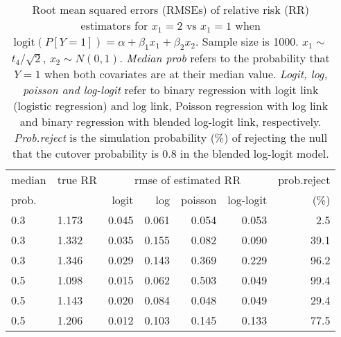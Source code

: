 \documentclass[12pt,a4paper]{article}
\begin{document}
\begin{table}[H] 
\small\sf\centering 
\caption{Root mean squared errors (RMSEs) of relative risk (RR) estimators for $x_1=2$ vs $x_1=1$ when $\mbox{logit}(P[Y=1])=\alpha+\beta_1 x_1 + \beta_2 x_2$. Sample size is 1000. $x_1 \sim $$t_4/\sqrt{2}$, $x_2 \sim N(0,1)$. {\it Median prob} refers to the probability that $Y=1$ when both covariates are at their median value. {\it Logit, log, poisson and log-logit} refer to binary regression with logit link (logistic regression) and log link, Poisson regression with log link and binary regression with blended log-logit link, respectively. {\it Prob.reject} is the simulation probability (\%) of rejecting the null that the cutover probability is $0.8$ in the blended log-logit model.} 
\begin{tabular}{llrrrrr} 
\toprule 
median & true RR & \multicolumn{4}{c}{rmse of estimated RR} & prob.reject \\ 
prob. & & logit & log & poisson & log-logit  & (\%) \\ \midrule 
0.3 & 1.173 & 0.045 & 0.061 & 0.054 & 0.053 &  2.5 \\  
0.3 & 1.332 & 0.035 & 0.155 & 0.082 & 0.090 & 39.1 \\  
0.3 & 1.346 & 0.029 & 0.143 & 0.369 & 0.229 & 96.2 \\  
0.5 & 1.098 & 0.015 & 0.062 & 0.503 & 0.049 & 99.4 \\  
0.5 & 1.143 & 0.020 & 0.084 & 0.048 & 0.049 & 29.4 \\  
0.5 & 1.206 & 0.012 & 0.103 & 0.145 & 0.133 & 77.5 \\  
\bottomrule 
\end{tabular} 
\end{table} 
\end{document}
